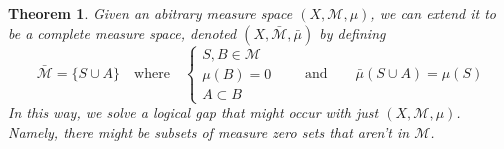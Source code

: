 \documentclass[12pt]{article}
\theoremstyle{plain}
\newtheorem{thm}{Theorem}[subsection]
\theoremstyle{definition}
\theoremstyle{remark}
\begin{document}
\begin{thm}
Given an abitrary measure space $(X,\mathscr{M},\mu)$, we can extend it to be a \emph{complete} measure space, denoted $(X,\bar{\mathscr{M}},\bar{\mu})$ by defining
\[
    \bar{\mathscr{M}} = \{S\cup A \} 
    \quad \text{where} \quad 
    \left\{
        \begin{array}{l}
        S, B\in\mathscr{M} \\
        \mu(B) = 0 \\ 
        A \subset B 
    \end{array}
    \right.
    \qquad \text{and} \qquad
    \bar{\mu}(S\cup A) = \mu(S)
\]
In this way, we solve a logical gap that might occur with just $(X,\mathscr{M},\mu)$. Namely, there might be subsets of measure zero sets that aren't in $\mathscr{M}$. 
\end{thm}
\end{document}
